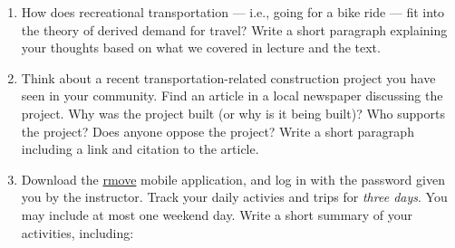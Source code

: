 \documentclass[]{book}
\begin{document}
\begin{enumerate}
\def\labelenumi{\arabic{enumi}.}
\item
  How does recreational transportation --- i.e., going for a bike ride --- fit into the
  theory of derived demand for travel? Write a short paragraph explaining your thoughts
  based on what we covered in lecture and the text.
\item
  Think about a recent transportation-related construction project you have
  seen in your community. Find an article in a local newspaper discussing the project.
  Why was the project built (or why is it being built)? Who supports the project?
  Does anyone oppose the project? Write a short paragraph including a link and
  citation to the article.
\item
  Download the \href{https://rmove.rsginc.com/}{rmove} mobile application, and log
  in with the password given you by the instructor. Track your daily activies and
  trips for \emph{three days}. You may include at most one weekend day. Write a short
  summary of your activities, including:


\end{enumerate}
\end{document}
